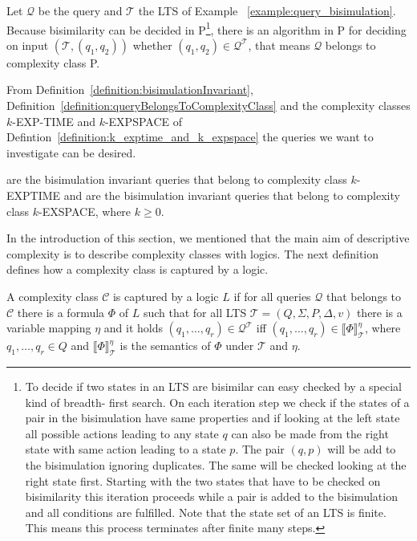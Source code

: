 \begin{example}{\cite{lange2014capturing}}
    Let $\mathcal{Q}$ be the query and $\mathcal{T}$ the LTS of Example~
    \ref{example:query_bisimulation}. Because bisimilarity can be decided in P\footnote{To 
    decide if two states in an LTS are bisimilar can easy checked by a special kind of breadth-
    first search. On each iteration step we check if the states of a pair in the bisimulation have 
    same properties and if looking at the left state all possible actions leading to any state $q
    $ can also be made from the right state with same action leading to a state $p$. The pair $
    (q, p)$ will be add to the bisimulation ignoring duplicates. The same will be checked looking 
    at the right state first. Starting with the two states that have to be checked on bisimilarity this 
    iteration proceeds while a pair is added to the bisimulation and all conditions are fulfilled. Note that the state set of an LTS is finite. This means this process terminates after finite many steps.}, 
    there is an 
    algorithm in P for deciding on input $(\mathcal{T}, (q_1, q_2))$ whether $(q_1, q_2) \in 
    \mathcal{Q}^\mathcal{T}$, that means $\mathcal{Q}$ belongs to 
    complexity class P.
\end{example}

From Definition~\ref{definition:bisimulationInvariant}, Definition~\ref{definition:queryBelongsToComplexityClass}
and the complexity classes $k$-EXP-TIME and $k$-EXPSPACE of Defintion~\ref{definition:k_exptime_and_k_expspace}
the queries we want to investigate can be desired.

\begin{definition}
    \label{definition:kExptimekExpspace}
     are the bisimulation invariant queries that belong to complexity class $k$-EXPTIME and
     are the bisimulation invariant queries that belong to complexity class $k$-EXSPACE, where $k \geq 0$.
\end{definition}

In the introduction of this section, we mentioned that the main aim of descriptive complexity is to describe complexity classes with logics. The next definition defines how a complexity class is captured by a logic. 

\begin{definition}
A complexity class $\mathcal{C}$ is captured by a logic $L$ if for all queries $\mathcal{Q}$ that belongs to $\mathcal{C}$ there is a formula $\Phi$ of $L$ such that for all LTS $\mathcal{T} = (Q, \Sigma, P, \Delta, v)$ there is a variable mapping $\eta$ and it holds $(q_1, \dots, q_{r}) \in \mathcal{Q}^\mathcal{T}$ iff $(q_1, \dots, q_{r}) \in \llbracket \Phi \rrbracket^\eta_\mathcal{T}$, where $q_1, \dots, q_r \in Q$ and $\llbracket \Phi \rrbracket^\eta_\mathcal{T}$ is the semantics of $\Phi$ under $\mathcal{T}$ and $\eta$.
\end{definition}


